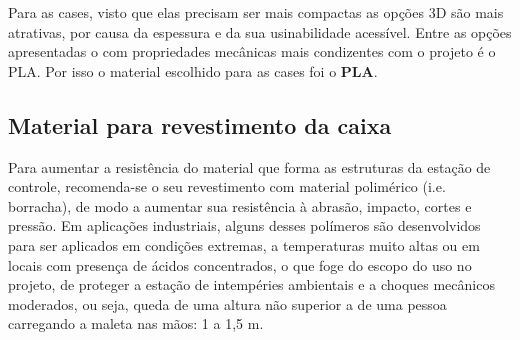 \par Para as cases, visto que elas precisam ser mais compactas as opções 3D são mais atrativas, por causa da espessura e da sua usinabilidade acessível. Entre as opções apresentadas o com propriedades mecânicas mais condizentes com o projeto é o PLA. Por isso o material escolhido para as cases foi o \textbf{PLA}. 

\subsection{Material para revestimento da caixa}
\label{revestimento}

\par Para aumentar a resistência do material que forma as estruturas da estação de controle, recomenda-se o seu revestimento com material polimérico (i.e. borracha), de modo a aumentar sua resistência à abrasão, impacto, cortes e pressão. Em aplicações industriais, alguns desses polímeros são desenvolvidos para ser aplicados em condições extremas, a temperaturas muito altas ou em locais com presença de ácidos concentrados, o que foge do escopo do uso no projeto, de proteger a estação de intempéries ambientais e a choques mecânicos moderados, ou seja, queda de uma altura não superior a de uma pessoa carregando a maleta nas mãos: 1 a 1,5 m.

